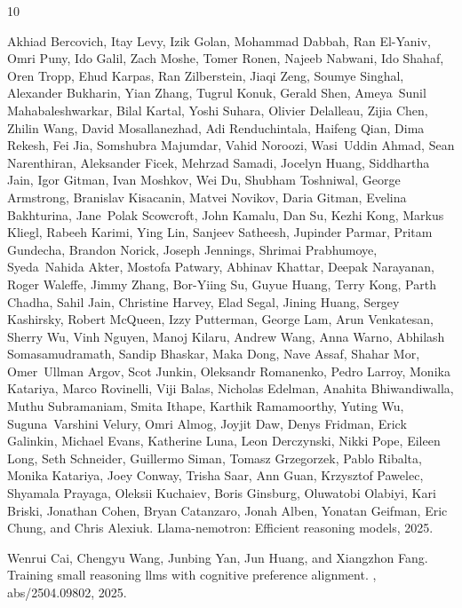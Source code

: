 \documentclass{article}
\begin{document}
{
    \begin{thebibliography}{10}

        Akhiad Bercovich, Itay Levy, Izik Golan, Mohammad Dabbah, Ran El-Yaniv, Omri Puny, Ido Galil, Zach Moshe, Tomer Ronen, Najeeb Nabwani, Ido Shahaf, Oren Tropp, Ehud Karpas, Ran Zilberstein, Jiaqi Zeng, Soumye Singhal, Alexander Bukharin, Yian Zhang, Tugrul Konuk, Gerald Shen, Ameya~Sunil Mahabaleshwarkar, Bilal Kartal, Yoshi Suhara, Olivier Delalleau, Zijia Chen, Zhilin Wang, David Mosallanezhad, Adi Renduchintala, Haifeng Qian, Dima Rekesh, Fei Jia, Somshubra Majumdar, Vahid Noroozi, Wasi~Uddin Ahmad, Sean Narenthiran, Aleksander Ficek, Mehrzad Samadi, Jocelyn Huang, Siddhartha Jain, Igor Gitman, Ivan Moshkov, Wei Du, Shubham Toshniwal, George Armstrong, Branislav Kisacanin, Matvei Novikov, Daria Gitman, Evelina Bakhturina, Jane~Polak Scowcroft, John Kamalu, Dan Su, Kezhi Kong, Markus Kliegl, Rabeeh Karimi, Ying Lin, Sanjeev Satheesh, Jupinder Parmar, Pritam Gundecha, Brandon Norick, Joseph Jennings, Shrimai Prabhumoye, Syeda~Nahida Akter, Mostofa Patwary, Abhinav Khattar, Deepak Narayanan, Roger Waleffe,
          Jimmy Zhang, Bor-Yiing Su, Guyue Huang, Terry Kong, Parth Chadha, Sahil Jain, Christine Harvey, Elad Segal, Jining Huang, Sergey Kashirsky, Robert McQueen, Izzy Putterman, George Lam, Arun Venkatesan, Sherry Wu, Vinh Nguyen, Manoj Kilaru, Andrew Wang, Anna Warno, Abhilash Somasamudramath, Sandip Bhaskar, Maka Dong, Nave Assaf, Shahar Mor, Omer~Ullman Argov, Scot Junkin, Oleksandr Romanenko, Pedro Larroy, Monika Katariya, Marco Rovinelli, Viji Balas, Nicholas Edelman, Anahita Bhiwandiwalla, Muthu Subramaniam, Smita Ithape, Karthik Ramamoorthy, Yuting Wu, Suguna~Varshini Velury, Omri Almog, Joyjit Daw, Denys Fridman, Erick Galinkin, Michael Evans, Katherine Luna, Leon Derczynski, Nikki Pope, Eileen Long, Seth Schneider, Guillermo Siman, Tomasz Grzegorzek, Pablo Ribalta, Monika Katariya, Joey Conway, Trisha Saar, Ann Guan, Krzysztof Pawelec, Shyamala Prayaga, Oleksii Kuchaiev, Boris Ginsburg, Oluwatobi Olabiyi, Kari Briski, Jonathan Cohen, Bryan Catanzaro, Jonah Alben, Yonatan Geifman, Eric Chung, and Chris
          Alexiuk.
        \newblock Llama-nemotron: Efficient reasoning models, 2025.
        
        Wenrui Cai, Chengyu Wang, Junbing Yan, Jun Huang, and Xiangzhon Fang.
        \newblock Training small reasoning llms with cognitive preference alignment.
        , abs/2504.09802, 2025.
        

\end{thebibliography}}
\end{document}
